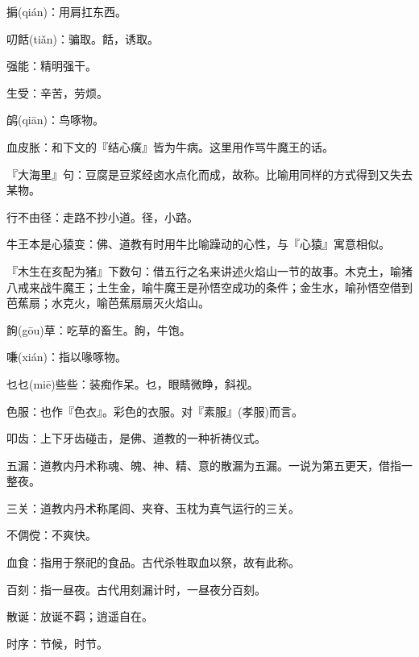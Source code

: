 \startbuffer[1774]
掮(qián)：用肩扛东西。
\stopbuffer


\startbuffer[1775]
叨餂(tiǎn)：骗取。餂，诱取。
\stopbuffer


\startbuffer[1776]
强能：精明强干。
\stopbuffer


\startbuffer[1777]
生受：辛苦，劳烦。
\stopbuffer


\startbuffer[1778]
鹐(qiān)：鸟啄物。
\stopbuffer


\startbuffer[1779]
血皮胀：和下文的『结心癀』皆为牛病。这里用作骂牛魔王的话。
\stopbuffer


\startbuffer[1780]
『大海里』句：豆腐是豆浆经卤水点化而成，故称。比喻用同样的方式得到又失去某物。
\stopbuffer


\startbuffer[1781]
行不由径：走路不抄小道。径，小路。
\stopbuffer


\startbuffer[1782]
牛王本是心猿变：佛、道教有时用牛比喻躁动的心性，与『心猿』寓意相似。
\stopbuffer


\startbuffer[1783]
『木生在亥配为猪』下数句：借五行之名来讲述火焰山一节的故事。木克土，喻猪八戒来战牛魔王；土生金，喻牛魔王是孙悟空成功的条件；金生水，喻孙悟空借到芭蕉扇；水克火，喻芭蕉扇扇灭火焰山。
\stopbuffer


\startbuffer[1784]
䬲(gōu)草：吃草的畜生。䬲，牛饱。
\stopbuffer


\startbuffer[1785]
嗛(xián)：指以喙啄物。
\stopbuffer


\startbuffer[1786]
乜乜(miē)些些：装痴作呆。乜，眼睛微睁，斜视。
\stopbuffer


\startbuffer[1787]
色服：也作『色衣』。彩色的衣服。对『素服』(孝服)而言。
\stopbuffer


\startbuffer[1788]
叩齿：上下牙齿碰击，是佛、道教的一种祈祷仪式。
\stopbuffer


\startbuffer[1789]
五漏：道教内丹术称魂、魄、神、精、意的散漏为五漏。一说为第五更天，借指一整夜。
\stopbuffer


\startbuffer[1790]
三关：道教内丹术称尾闾、夹脊、玉枕为真气运行的三关。
\stopbuffer


\startbuffer[1791]
不倜傥：不爽快。
\stopbuffer


\startbuffer[1792]
血食：指用于祭祀的食品。古代杀牲取血以祭，故有此称。
\stopbuffer


\startbuffer[1793]
百刻：指一昼夜。古代用刻漏计时，一昼夜分百刻。
\stopbuffer


\startbuffer[1794]
散诞：放诞不羁；逍遥自在。
\stopbuffer


\startbuffer[1795]
时序：节候，时节。
\stopbuffer


